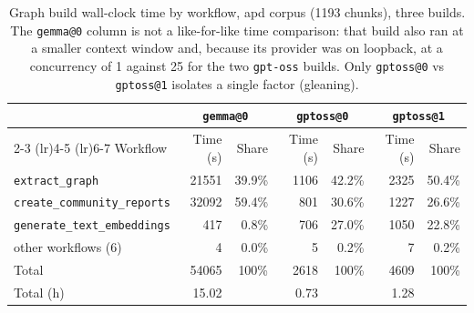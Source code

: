 \begin{table}[htbp]
  \centering
  \caption{Graph build wall-clock time by workflow, apd corpus (1193 chunks), three builds.
    The \texttt{gemma@0} column is not a like-for-like time comparison: that build also ran at a
    smaller context window and, because its provider was on loopback, at a concurrency of 1 against
    25 for the two \texttt{gpt-oss} builds. Only \texttt{gptoss@0} vs \texttt{gptoss@1} isolates a
    single factor (gleaning).}
  \label{tab:graph-build-time}
  \begin{tabular}{lrrrrrr}
    \toprule
    & \multicolumn{2}{c}{\texttt{gemma@0}} & \multicolumn{2}{c}{\texttt{gptoss@0}} & \multicolumn{2}{c}{\texttt{gptoss@1}} \\
    \cmidrule(lr){2-3} \cmidrule(lr){4-5} \cmidrule(lr){6-7}
    Workflow & Time (s) & Share & Time (s) & Share & Time (s) & Share \\
    \midrule
    \texttt{extract\_graph}             & 21551 & 39.9\% & 1106 & 42.2\% & 2325 & 50.4\% \\
    \texttt{create\_community\_reports} & 32092 & 59.4\% &  801 & 30.6\% & 1227 & 26.6\% \\
    \texttt{generate\_text\_embeddings} &   417 &  0.8\% &  706 & 27.0\% & 1050 & 22.8\% \\
    other workflows (6)                 &     4 &  0.0\% &    5 &  0.2\% &    7 &  0.2\% \\
    \midrule
    Total                               & 54065 & 100\%  & 2618 & 100\%  & 4609 & 100\%  \\
    Total (h)                           & 15.02 &        & 0.73 &        & 1.28 &        \\
    \bottomrule
  \end{tabular}
\end{table}
